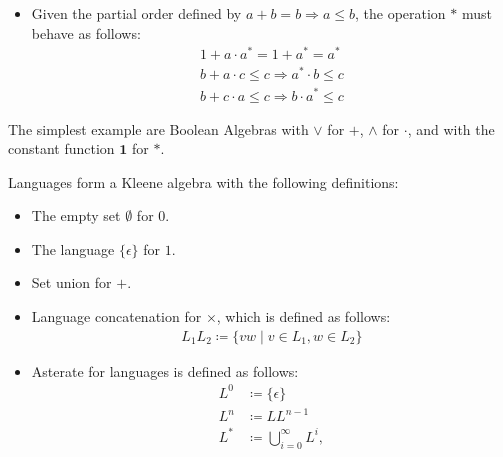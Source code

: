 \begin{definition}
\begin{itemize}
        \item Given the partial order defined by $a + b = b \Rightarrow a \leq b$,
            the operation $\ast$ must behave as follows:
            \begin{align}
                1 + a \cdot a^\ast = 1 + a^\ast = a^\ast\\
                b + a \cdot c \leq c \Rightarrow a^\ast \cdot b \leq c\\
                b + c \cdot a \leq c \Rightarrow b \cdot a^\ast \leq c
            \end{align}

    \end{itemize}

\end{definition}

\begin{theorem}
    The simplest example are Boolean Algebras with $\vee$ for $+$, $\wedge$ for $\cdot$,
    and with the constant function $\mathbf{1}$ for $\ast$.
\end{theorem}

\begin{theorem}
    Languages form a Kleene algebra with the following definitions:
    \begin{itemize}
        \item The empty set $\emptyset$ for $0$.
        \item The language $\{ \epsilon \}$ for $1$.
        \item Set union for $+$.
        \item Language concatenation for $\times$, which is defined as follows:
            \begin{align}
                L_1 L_2 \coloneqq \{ v w \mid v \in L_1, w \in L_2 \}
            \end{align}
        \item Asterate for languages is defined as follows:
            \begin{align}
                L^0 &\coloneqq \{\epsilon\} \\
                L^n &\coloneqq L L^{n-1} \\
                L^\ast &\coloneqq \bigcup\limits_{i = 0}^\infty L^i,
            \end{align}
    \end{itemize}
\end{theorem}
